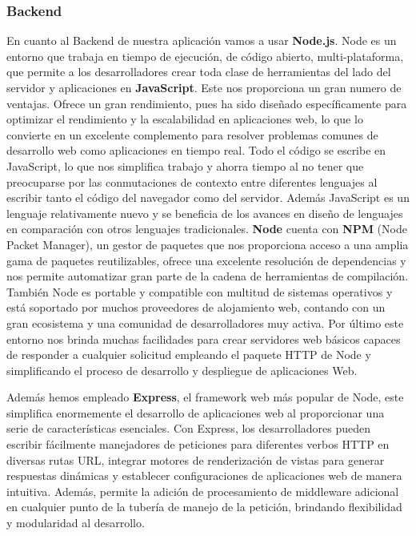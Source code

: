 \documentclass[12pt]{article}
\begin{document}
\subsubsection{Backend}
En cuanto al Backend de nuestra aplicación vamos a usar \textbf{Node.js}. Node es un entorno que trabaja en tiempo de ejecución, de código abierto, multi-plataforma, 
que permite a los desarrolladores crear toda clase de herramientas del lado del servidor y aplicaciones en \textbf{JavaScript}. 
Este nos proporciona un gran numero de ventajas. Ofrece un gran rendimiento, pues ha sido diseñado específicamente para optimizar el rendimiento y la
escalabilidad en aplicaciones web, lo que lo convierte en un excelente complemento para resolver problemas comunes de desarrollo web como aplicaciones
en tiempo real. Todo el código se escribe en JavaScript, lo que nos simplifica trabajo y ahorra tiempo al no tener que preocuparse por las conmutaciones
de contexto entre diferentes lenguajes al escribir tanto el código del navegador como del servidor. Además JavaScript es un lenguaje relativamente nuevo
y se beneficia de los avances en diseño de lenguajes en comparación con otros lenguajes tradicionales. \textbf{Node} cuenta con \textbf{NPM} (Node Packet Manager), un gestor 
de paquetes que nos proporciona acceso a una amplia gama de paquetes reutilizables, ofrece una excelente resolución de dependencias y nos permite automatizar
gran parte de la cadena de herramientas de compilación. También Node es portable y compatible con multitud de sistemas operativos y está soportado por muchos
proveedores de alojamiento web, contando con un gran ecosistema y una comunidad de desarrolladores muy activa. Por último este entorno nos brinda muchas facilidades
para crear servidores web básicos capaces de responder a cualquier solicitud empleando el paquete HTTP de Node y simplificando el proceso de desarrollo y despliegue de
aplicaciones Web.\cite{node}

Además hemos empleado \textbf{Express}, el framework web más popular de Node, este simplifica enormemente el desarrollo de aplicaciones web al proporcionar
una serie de características esenciales. Con Express, los desarrolladores pueden escribir fácilmente manejadores de peticiones para diferentes 
verbos HTTP en diversas rutas URL, integrar motores de renderización de vistas para generar respuestas dinámicas y establecer configuraciones de 
aplicaciones web de manera intuitiva. Además, permite la adición de procesamiento de middleware adicional en cualquier punto de la tubería de manejo de 
la petición, brindando flexibilidad y modularidad al desarrollo. \cite{node}
\end{document}
